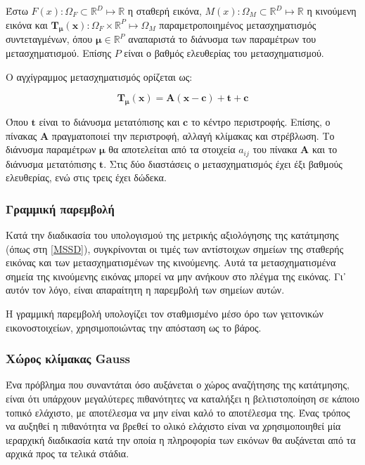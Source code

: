 \documentclass[a4paper,12pt]{article}
\newcommand{\R}{\mathbb{R}}
\begin{document}
Έστω $F(x): \Omega_F \subset \R^D \mapsto \R$ η σταθερή εικόνα, $M(x): \Omega_M
\subset \R^D \mapsto \R$ η κινούμενη εικόνα και $\bm{T_{\mu}}(\bm{x}): \Omega_F
\times \R^P \mapsto \Omega_M$ παραμετροποιημένος μετασχηματισμός συντεταγμένων,
όπου $\bm{\mu} \in \R^P$ αναπαριστά το διάνυσμα των παραμέτρων του
μετασχηματισμού. Επίσης $P$ είναι ο βαθμός ελευθερίας του μετασχηματισμού.

Ο αγχίγραμμος μετασχηματισμός ορίζεται ως:

\begin{equation*}
    \bm{T_{\mu}}(\bm{x}) = \bm{A}(\bm{x} - \bm{c}) + \bm{t} + \bm{c}
\end{equation*}

Όπου $\bm{t}$ είναι το διάνυσμα μετατόπισης και $\bm{c}$ το κέντρο περιστροφής.
Επίσης, ο πίνακας $\bm{A}$ πραγματοποιεί την περιστροφή, αλλαγή κλίμακας και
στρέβλωση. Το διάνυσμα παραμέτρων $\bm{\mu}$ θα αποτελείται από τα στοιχεία
$a_{ij}$ του πίνακα $\bm{A}$ και το διάνυσμα μετατόπισης $\bm{t}$. Στις δύο
διαστάσεις ο μετασχηματισμός έχει έξι βαθμούς ελευθερίας, ενώ στις τρεις έχει
δώδεκα.

\subsubsection{Γραμμική παρεμβολή} \label{reg:linear:1}

Κατά την διαδικασία του υπολογισμού της μετρικής αξιολόγησης της κατάτμησης
(όπως στη \ref{MSSD}), συγκρίνονται οι τιμές των αντίστοιχων σημείων της
σταθερής εικόνας και των μετασχηματισμένων της κινούμενης. Αυτά τα
μετασχηματισμένα σημεία της κινούμενης εικόνας μπορεί να μην ανήκουν στο πλέγμα
της εικόνας. Γι᾽ αυτόν τον λόγο, είναι απαραίτητη η παρεμβολή των σημείων αυτών.

Η γραμμική παρεμβολή υπολογίζει τον σταθμισμένο μέσο όρο των γειτονικών
εικονοστοιχείων, χρησιμοποιώντας την απόσταση ως το βάρος.

\subsubsection{Χώρος κλίμακας Gauss} \label{reg:gauss:1}

Ένα πρόβλημα που συναντάται όσο αυξάνεται ο χώρος αναζήτησης της κατάτμησης,
είναι ότι υπάρχουν μεγαλύτερες πιθανότητες να καταλήξει η βελτιστοποίηση σε
κάποιο τοπικό ελάχιστο, με αποτέλεσμα να μην είναι καλό το αποτέλεσμα της. Ένας
τρόπος να αυξηθεί η πιθανότητα να βρεθεί το ολικό ελάχιστο είναι να
χρησιμοποιηθεί μία ιεραρχική διαδικασία κατά την οποία η πληροφορία των εικόνων
θα αυξάνεται από τα αρχικά προς τα τελικά στάδια. 
\end{document}
